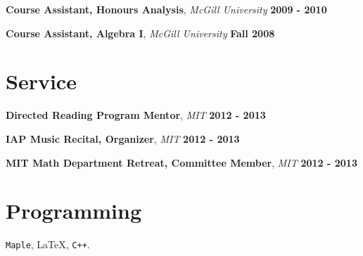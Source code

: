 \documentclass[margin,line]{resume}
\begin{document}
\begin{resume}
    \vspace{-2mm}
         \textbf{Course Assistant, Honours Analysis},     \textsl{McGill University} \hfill \textbf{2009 - 2010}

\vspace{-2mm}
\textbf{Course Assistant, Algebra I},    \textsl{McGill University}  \hfill \textbf{Fall 2008}

\vspace{2mm}


   \section{\mysidestyle Service}

    \textbf{Directed Reading Program Mentor}, \textsl{MIT} \hfill \textbf{2012 - 2013}

\vspace{-2mm}
         \textbf{IAP Music Recital, Organizer},     \textsl{MIT} \hfill \textbf{2012 - 2013}

\vspace{-2mm}
         \textbf{MIT Math Department Retreat, Committee Member},     \textsl{MIT} \hfill \textbf{2012 - 2013}
%
%






%   
%    
% 






    \section{\mysidestyle Programming} 

\texttt{Maple}, \LaTeX, \texttt{C++}.
%

\end{resume}
\end{document}
